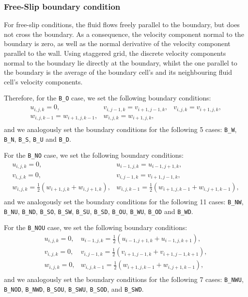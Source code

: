 \documentclass[a4paper, 12pt]{article}
\begin{document}
\subsubsection{Free-Slip boundary condition}
For free-slip conditions, the fluid flows freely parallel to the boundary, but does not cross the boundary. As a consequence, the velocity component normal to the boundary is zero, as well as the normal derivative of the velocity component parallel to the wall. Using staggered grid, the discrete velocity components normal to the boundary lie directly at the boundary, whilst the one parallel to the boundary is the average of the boundary cell's and its neighbouring fluid cell's velocity components.

Therefore, for the \texttt{B\_O} case, we set the following boundary conditions:
\begin{equation}
\begin{array}{lll}
u_{i,j,k} = 0, & v_{i,j-1,k} = v_{i+1,j-1,k}, & v_{i,j,k} = v_{i+1,j,k}, \\
w_{i,j,k-1} = w_{i+1,j,k-1}, & w_{i,j,k} = w_{i+1,j,k},& \\
\end{array}
\end{equation}
and we analogously set the boundary conditions for the following 5 cases: \texttt{B\_W}, \texttt{B\_N}, \texttt{B\_S}, \texttt{B\_U} and \texttt{B\_D}.

For the \texttt{B\_NO} case, we set the following boundary conditions:
\begin{equation}
\begin{array}{ll}
u_{i,j,k} = 0, & u_{i-1,j,k} = u_{i-1,j+1,k}, \\
v_{i,j,k} = 0, & v_{i,j-1,k} = v_{i+1,j-1,k}, \\
w_{i,j,k} = \frac{1}{2}(w_{i+1,j,k}+w_{i,j+1,k}), &
w_{i,j,k-1} = \frac{1}{2}(w_{i+1,j,k-1}+w_{i,j+1,k-1}), \\
\end{array}
\end{equation}
and we analogously set the boundary conditions for the following 11 cases: \texttt{B\_NW}, \texttt{B\_NU}, \texttt{B\_ND}, \texttt{B\_SO}, \texttt{B\_SW}, \texttt{B\_SU}, \texttt{B\_SD}, \texttt{B\_OU}, \texttt{B\_WU}, \texttt{B\_OD} and \texttt{B\_WD}.

For the \texttt{B\_NOU} case, we set the following boundary conditions:
\begin{equation}
\begin{array}{ll}
u_{i,j,k} = 0, & u_{i-1,j,k} = \frac{1}{2}(u_{i-1,j+1,k}+u_{i-1,j,k+1}), \\
v_{i,j,k} = 0, & v_{i,j-1,k} = \frac{1}{2}(v_{i+1,j-1,k}+v_{i+1,j-1,k+1}), \\
w_{i,j,k} = 0, & w_{i,j,k-1} = \frac{1}{2}(w_{i+1,j,k-1}+w_{i,j+1,k-1}), \\
\end{array}
\end{equation}
and we analogously set the boundary conditions for the following 7 cases: \texttt{B\_NWU}, \texttt{B\_NOD}, \texttt{B\_NWD}, \texttt{B\_SOU}, \texttt{B\_SWU}, \texttt{B\_SOD}, and \texttt{B\_SWD}.
\end{document}
